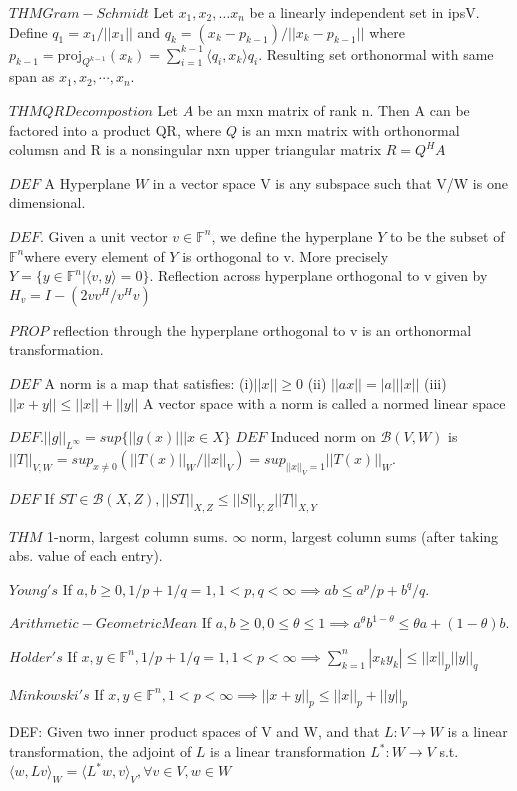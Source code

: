 \documentclass[8pt]{extarticle}
\theoremstyle{definition}
\begin{document}
{$THM Gram-Schmidt$ Let $x_1, x_2,\ldots x_n$ be a linearly independent set in ipsV. Define $q_1 = x_1/||x_1||$ and $q_k = (x_k - p_{ k-1}) / ||x_k - p_{ k-1}||$ where $p_{k-1} = \text{proj}_{Q^{k-1}}(x_k) = \sum^{k-1}_{i=1} \langle q_i, x_k \rangle q_i$. Resulting set orthonormal with same span as $x_1, x_2,\cdots, x_n$.

$THMQRDecompostion$
Let $A$ be an mxn matrix of rank n. Then A can be factored into a product QR, where $Q$ is an mxn matrix with orthonormal columsn and R is a nonsingular nxn upper triangular matrix $R = Q^HA$

$DEF$ A Hyperplane $W$ in a vector space V is any subspace such that V/W is one dimensional.

$DEF$. Given a unit vector $ v \in \mathbb{F}^n$, we define the hyperplane $Y$ to be the subset of $\mathbb{F}^n$where every element of $Y$ is orthogonal to v. More precisely $Y = \{y \in  \mathbb{F}^n | \langle v,y \rangle = 0\}$. Reflection across hyperplane orthogonal to v given by $H_v = I - (2vv^H/v^Hv) $

$PROP$ reflection through the hyperplane orthogonal to v is an orthonormal transformation.

$DEF$ A norm is a map that satisfies: 
(i)$||x|| \geq 0$
(ii) $||ax|| = |a| ||x||$
(iii) $||x + y|| \leq ||x|| + ||y||$
A vector space with a norm is called a normed linear space

$DEF. ||g||_{L^\infty} = sup\{ ||g(x)|| | x \in X\}$
$DEF$ Induced norm  on $\mathscr{B}(V,W)$ is $||T||_{V,W} = sup_{x\neq 0} (||T(x)||_W/||x||_V) = sup_{||x||_V =1} ||T(x)||_W$. 

$DEF$ If $ST \in \mathscr{B}(X,Z), 
||ST||_{X,Z} \leq ||S||_{Y,Z}||T||_{X,Y}$

$THM$
1-norm, largest column sums. $\infty$ norm, largest column sums (after taking abs. value of each entry).

$Young's$
If $a,b \geq 0, 1/p + 1/q = 1, 1 < p,q < \infty \implies ab \leq a^p/p + b^q/q$.

$Arithmetic-Geometric Mean$ If $a,b \geq 0, 0 \leq \theta \leq 1 \implies a^\theta b^{1-\theta} \leq \theta a  + (1- \theta)b$.

$Holder's$ If $x,y \in \mathbb{F}^n, 1/p + 1/q = 1, 1 < p < \infty \implies \sum^{n}_{k=1} |x_ky_k| \leq ||x||_p||y||_q$

$Minkowski's$ 
If $x,y \in \mathbb{F}^n, 1 < p < \infty \implies ||x+y||_p \leq ||x||_p + ||y||_p$


DEF: Given two inner product spaces of V and W, and that $L: V \to W$ is a linear transformation, the adjoint of $L$ is a linear transformation $L^*:W \to V$ s.t. $\langle w,Lv \rangle_W = \langle L^*w,v \rangle_V, \forall v \in V, w\in W$


}
\end{document}
